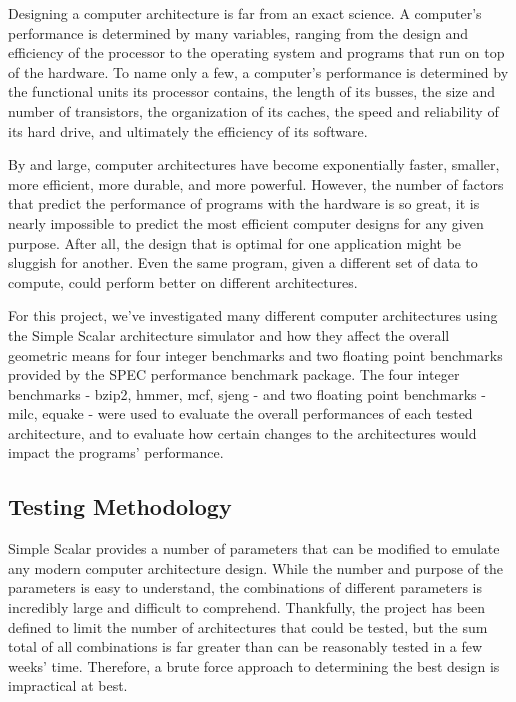 \documentclass[paper=a4, fontsize=12pt]{scrartcl} %
\numberwithin{equation}{section} %
\numberwithin{figure}{section} %
\numberwithin{table}{section} %
\begin{document}
Designing a computer architecture is far from an exact science. A computer's performance is determined by many variables, ranging from the design and efficiency of the processor to the operating system and programs that run on top of the hardware. To name only a few, a computer's performance is determined by the functional units its processor contains, the length of its busses, the size and number of transistors, the organization of its caches, the speed and reliability of its hard drive, and ultimately the efficiency of its software.

By and large, computer architectures have become exponentially faster, smaller, more efficient, more durable, and more powerful. However, the number of factors that predict the performance of programs with the hardware is so great, it is nearly impossible to predict the most efficient computer designs for any given purpose. After all, the design that is optimal for one application might be sluggish for another. Even the same program, given a different set of data to compute, could perform better on different architectures.

For this project, we've investigated many different computer architectures using the Simple Scalar architecture simulator and how they affect the overall geometric means for four integer benchmarks and two floating point benchmarks provided by the SPEC performance benchmark package. The four integer benchmarks - bzip2, hmmer, mcf, sjeng - and two floating point benchmarks - milc, equake - were used to evaluate the overall performances of each tested architecture, and to evaluate how certain changes to the architectures would impact the programs' performance.


\subsection{Testing Methodology}

Simple Scalar provides a number of parameters that can be modified to emulate any modern computer architecture design. While the number and purpose of the parameters is easy to understand, the combinations of different parameters is incredibly large and difficult to comprehend. Thankfully, the project has been defined to limit the number of architectures that could be tested, but the sum total of all combinations is far greater than can be reasonably tested in a few weeks' time. Therefore, a brute force approach to determining the best design is impractical at best.
\end{document}

